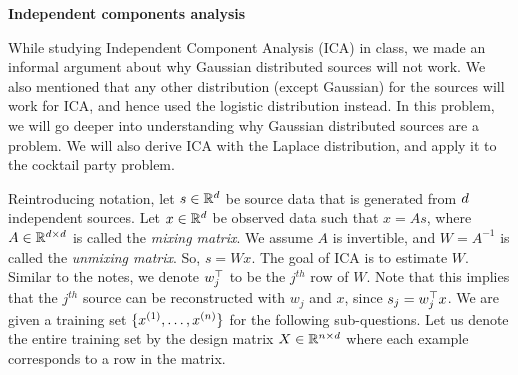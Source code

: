 \item {} {\bf Independent components analysis}


While studying Independent Component Analysis (ICA) in class, we made an informal argument about why Gaussian distributed sources will not work. We also mentioned that any other distribution (except Gaussian) for the sources will work for ICA, and hence used the logistic distribution instead. In this problem, we will go deeper into understanding why Gaussian distributed sources are a problem. We will also derive ICA with the Laplace distribution, and apply it to the cocktail party problem.

Reintroducing notation, let $s \in \mathbb{R}^{d}$ be source data that is generated from ${d}$ independent sources.
Let $x \in \mathbb{R}^{d}$ be observed data such that $x = As$, where $A\in\mathbb{R}^{{d} \times {d}}$ is called the \emph{mixing matrix}.
We assume $A$ is invertible, and $W = A^{-1}$ is called the \emph{unmixing matrix}. So, $s = Wx$.
The goal of ICA is to estimate $W$. Similar to the notes, we denote $w_j^{\top}$ to be the $j^{th}$ row of $W$.
Note that this implies that the $j^{th}$ source can be reconstructed with $w_j$ and $x$, since $s_j = w_j^{\top} x$.
We are given a training set $\{x^{(1)},\ldots,x^{({n})}\}$ for the following sub-questions.
Let us denote the entire training set by the design matrix $X \in \mathbb{R}^{{n} \times {d}}$ where each example corresponds to a row in the matrix.

\begin{enumerate}
    

\ifnum{} {
  
} \fi

    

\ifnum{} {
  
} \fi


    
    
\ifnum{} {
  
} \fi
\end{enumerate}
